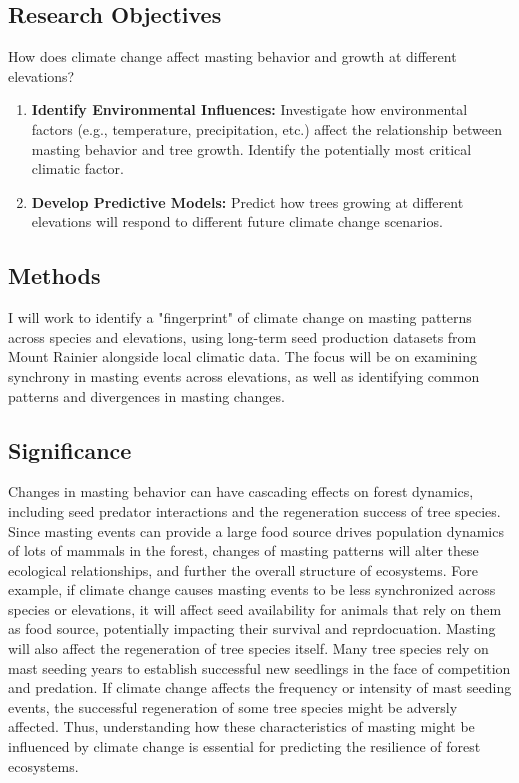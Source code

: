 \documentclass[11pt,letter]{article}
\begin{document}
\subsection{Research Objectives}
How does climate change affect masting behavior and growth at different elevations? %
	\begin{enumerate}
\item \textbf{Identify Environmental Influences:} Investigate how environmental factors (e.g., temperature, precipitation, etc.) affect the relationship between masting behavior and tree growth. Identify the potentially most critical climatic factor.	
\item \textbf{Develop Predictive Models:} Predict how trees growing at different elevations will respond to different future climate change scenarios.	%
	\end{enumerate}
\subsection{Methods}
I will work to identify a "fingerprint" of climate change on masting patterns across species and elevations, using long-term seed production datasets from Mount Rainier alongside local climatic data. The focus will be on examining synchrony in masting events across elevations, as well as identifying common patterns and divergences in masting changes.
\subsection{Significance}
Changes in masting behavior can have cascading effects on forest dynamics, including seed predator interactions and the regeneration success of tree species. Since masting events can provide a large food source drives population dynamics of lots of mammals in the forest, changes of masting patterns will alter these ecological relationships, and further the overall structure of ecosystems. Fore example, if climate change causes masting events to be less synchronized across species or elevations, it will affect seed availability for animals that rely on them as food source, potentially impacting their survival and reprdocuation.
Masting will also affect the regeneration of tree species itself. Many tree species rely on mast seeding years to establish successful new seedlings in the face of competition and predation. If climate change affects the frequency or intensity of mast seeding events, the successful regeneration of some tree species might be adversly affected. Thus, understanding how these characteristics of masting might be influenced by climate change is essential for predicting the resilience of forest ecosystems.


 
\end{document}
